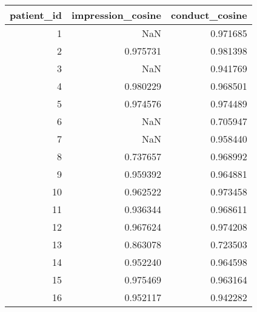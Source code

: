 \begin{tabular}{rrr}
\toprule
patient_id & impression_cosine & conduct_cosine \\
\midrule
1 & NaN & 0.971685 \\
2 & 0.975731 & 0.981398 \\
3 & NaN & 0.941769 \\
4 & 0.980229 & 0.968501 \\
5 & 0.974576 & 0.974489 \\
6 & NaN & 0.705947 \\
7 & NaN & 0.958440 \\
8 & 0.737657 & 0.968992 \\
9 & 0.959392 & 0.964881 \\
10 & 0.962522 & 0.973458 \\
11 & 0.936344 & 0.968611 \\
12 & 0.967624 & 0.974208 \\
13 & 0.863078 & 0.723503 \\
14 & 0.952240 & 0.964598 \\
15 & 0.975469 & 0.963164 \\
16 & 0.952117 & 0.942282 \\
\bottomrule
\end{tabular}
